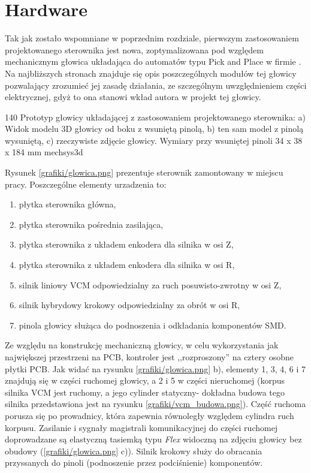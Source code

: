 \section{Hardware}

Tak jak zostało wspomniane w poprzednim rozdziale, pierwszym zastosowaniem projektowanego sterownika jest nowa, zoptymalizowana pod względem mechanicznym głowica układająca do automatów typu Pick and Place w firmie \firma{}. Na najbliższych stronach znajduje się opis poszczególnych modułów tej głowicy pozwalający zrozumieć jej zasadę działania, ze szczególnym uwzględnieniem części elektrycznej, gdyż to ona stanowi wkład autora w projekt tej głowicy.

	{140}
	{Prototyp głowicy układającej z zastosowaniem projektowanego sterownika: a) Widok modelu 3D głowicy od boku z wsuniętą pinolą, b) ten sam model z pinolą wysuniętą, c) rzeczywiste zdjęcie głowicy. Wymiary przy wsuniętej pinoli 34 x 38 x 184 mm}
	{mechsys3d}

Rysunek \ref{grafiki/glowica.png} prezentuje sterownik zamontowany w miejscu pracy. Poszczególne elementy urzadzenia to:

\begin{enumerate}
	\item płytka sterownika główna,
	\item płytka sterownika pośrednia zasilająca,
	\item płytka sterownika z układem enkodera dla silnika w osi Z,
	\item płytka sterownika z układem enkodera dla silnika w osi R,
	\item silnik liniowy VCM odpowiedzialny za ruch posuwisto-zwrotny w osi Z,
	\item silnik hybrydowy krokowy odpowiedzialny za obrót w osi R,
	\item pinola głowicy służąca do podnoszenia i odkładania komponentów SMD.
\end{enumerate}

Ze względu na konstrukcję mechaniczną głowicy, w celu wykorzystania jak największej przestrzeni na PCB, kontroler jest ,,rozproszony'' na cztery osobne płytki PCB. Jak widać na rysunku \ref{grafiki/glowica.png} b), elementy 1, 3, 4, 6 i 7 znajdują się w części ruchomej głowicy, a 2 i 5 w części nieruchomej (korpus silnika VCM jest ruchomy, a jego cylinder statyczny- dokładna budowa tego silnika przedstawiona jest na rysunku \ref{grafiki/vcm_budowa.png}). Część ruchoma porusza się po prowadnicy, która zapewnia równoległy względem cylindra ruch korpusu. Zasilanie i sygnały magistrali komunikacyjnej do części ruchomej doprowadzane są elastyczną tasiemką typu {\it Flex} widoczną na zdjęciu głowicy bez obudowy (\ref{grafiki/glowica.png} c)). Silnik krokowy służy do obracania przyssanych do pinoli (podnoszenie przez podciśnienie) komponentów. \\

